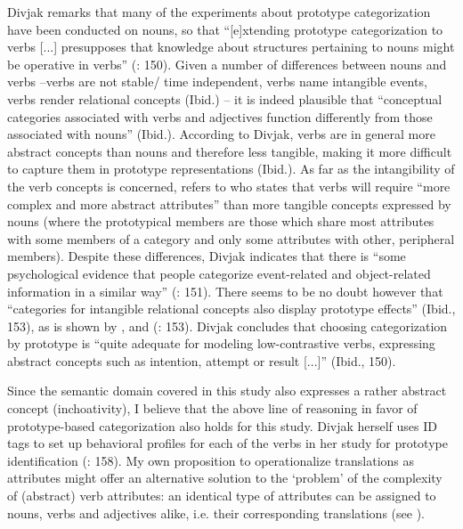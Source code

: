 Divjak remarks that many of the experiments about prototype categorization have been conducted on nouns, so that “[e]xtending prototype categorization to verbs [...] presupposes that knowledge about structures pertaining to nouns might be operative in verbs” (\citealt{divjak_structuring_2010}: 150). Given a number of differences between nouns and verbs –verbs are not stable/ time independent, verbs name intangible events, verbs render relational concepts (Ibid.) – it is indeed plausible that “conceptual categories associated with verbs and adjectives function differently from those associated with nouns” (Ibid.). According to Divjak, verbs are in general more abstract concepts than nouns and therefore less tangible, making it more difficult to capture them in prototype representations (Ibid.). As far as the intangibility of the verb concepts is concerned, \citet[152]{divjak_structuring_2010} refers to \citet[114]{pulman_word_1983} who states that verbs will require “more complex and more abstract attributes” than more tangible concepts expressed by nouns (where the prototypical members are those which share most attributes with some members of a category and only some attributes with other, peripheral members). Despite these differences, Divjak indicates that there is “some psychological evidence that people categorize event-related and object-related information in a similar way” (\citealt{divjak_structuring_2010}: 151). There seems to be no doubt however that “categories for intangible relational concepts also display prototype effects” (Ibid., 153), as is shown by \citet{schmid_cottage_1993}, \citet{taylor_linguistic_1995,taylor_linguistic_2003} and \citet{geeraerts_preponderantieverschillen_1985, rudzka-ostyn_where_1988, geeraerts_homonymy_1990} (\citealt{divjak_structuring_2010}: 153). Divjak concludes that choosing categorization by prototype is “quite adequate for modeling low-contrastive verbs, expressing abstract concepts such as intention, attempt or result [...]” (Ibid., 150).



Since the semantic domain covered in this study also expresses a rather abstract concept (inchoativity), I believe that the above line of reasoning in favor of prototype-based categorization also holds for this study. Divjak herself uses ID tags to set up behavioral profiles for each of the verbs in her study for prototype identification (\citealt{divjak_structuring_2010}: 158). My own proposition to operationalize translations as attributes might offer an alternative solution to the ‘problem’ of the complexity of (abstract) verb attributes: an identical type of attributes can be assigned to nouns, verbs and adjectives alike, i.e. their corresponding translations (see ).



